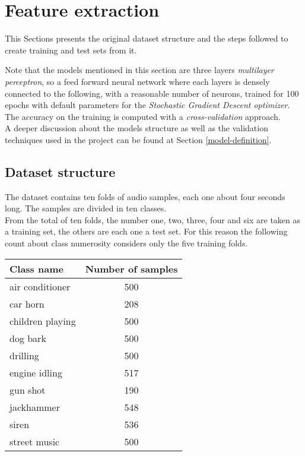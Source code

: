 \section{Feature extraction}
\label{feature-extraction}

This Sections presents the original dataset structure and the 
steps followed to create training and test sets from it.

Note that the models mentioned in this section are
three layers \emph{multilayer perceptron}, 
so a feed forward neural network where each layers 
is densely connected  to the following, 
with a reasonable number of neurons, trained 
for 100 epochs with default parameters for the \emph{Stochastic Gradient 
Descent optimizer}.~\cite{mlp}\cite{sgd}
The accuracy on the training is computed with a \emph{cross-validation} 
approach.~\cite{cross}\\
A deeper discussion about the models structure as well as the validation
techniques used in the project can be found at Section \vref{model-definition}.

\subsection{Dataset structure}
\label{dataset-structure}

The dataset contains ten folds of audio samples, each one about 
four seconds long. The samples are divided in ten classes.\\
From the total of ten folds, the number one, two, three, four and six 
are taken as a training set, the others are each one a test set.
For this reason the following count about class numerosity considers
only the five training folds.

\begin{center}
    \begin{tabular}{ |l|c| } 
        \hline
        Class name & Number of samples \\
        \hline
        air conditioner & 500 \\
        car horn & 208 \\
        children playing & 500 \\
        dog bark & 500 \\
        drilling & 500 \\
        engine idling & 517 \\
        gun shot & 190 \\
        jackhammer & 548 \\
        siren & 536 \\
        street music & 500 \\
        \hline
    \end{tabular}
\end{center}

